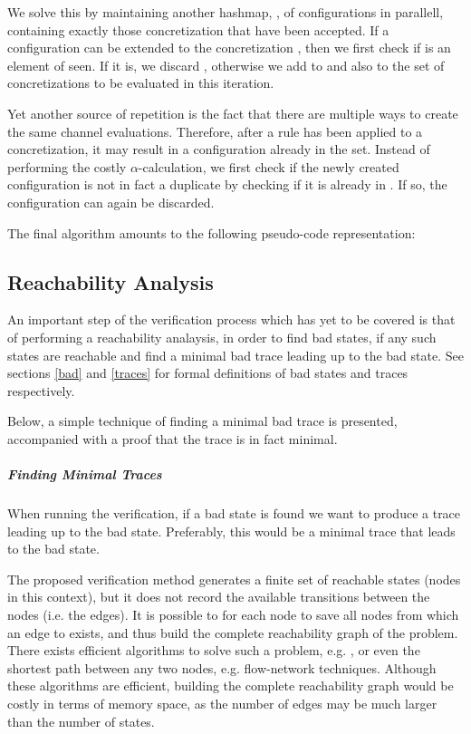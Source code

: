 We solve this by maintaining another hashmap, , of configurations in parallell, containing exactly those concretization that have been accepted. If a configuration  can be extended to the concretization , then we first check if  is an element of seen. If it is, we discard , otherwise we add  to  and also to the set of concretizations to be evaluated in this iteration.

Yet another source of repetition is the fact that there are multiple ways to create the same channel evaluations. Therefore, after a rule has been applied to a concretization, it may result in a configuration already in the set. Instead of performing the costly $\alpha$-calculation, we first check if the newly created configuration is not in fact a duplicate by checking if it is already in . If so, the configuration can again be discarded.

The final algorithm amounts to the following pseudo-code representation:

\subsection{Reachability Analysis}
An important step of the verification process which has yet to be covered is that of performing a reachability analaysis, in order to find bad states, if any such states are reachable and find a minimal bad trace leading up to the bad state. See sections \ref{bad} and \ref{traces} for formal definitions of bad states and traces respectively.

Below, a simple technique of finding a minimal bad trace is presented, accompanied with a proof that the trace is in fact minimal.

\subparagraph{Finding Minimal Traces}
When running the verification, if a bad state is found we want to produce a trace leading up to the bad state. Preferably, this would be a minimal trace that leads to the bad state.

The proposed verification method generates a finite set of reachable states (nodes in this context), but it does not record the available transitions between the nodes (i.e. the edges). It is possible to for each node  to save all nodes  from which an edge to  exists, and thus build the complete reachability graph of the problem. There exists efficient algorithms to solve such a problem, e.g. , or even the shortest path between any two nodes, e.g. flow-network techniques. Although these algorithms are efficient, building the complete reachability graph would be costly in terms of memory space, as the number of edges may be much larger than the number of states.


